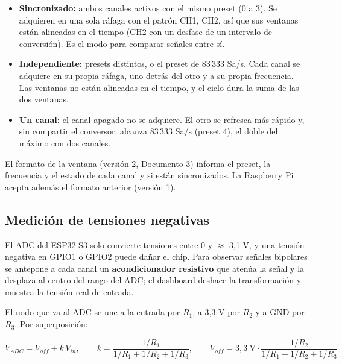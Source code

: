 \documentclass[12pt,a4paper]{article}
\begin{document}
\begin{itemize}
  \item \textbf{Sincronizado:} ambos canales activos con el mismo preset (0 a 3). Se adquieren en una sola ráfaga con el patrón CH1, CH2, así que sus ventanas están alineadas en el tiempo (CH2 con un desfase de un intervalo de conversión). Es el modo para comparar señales entre sí.
  \item \textbf{Independiente:} presets distintos, o el preset de 83\,333 Sa/s. Cada canal se adquiere en su propia ráfaga, uno detrás del otro y a su propia frecuencia. Las ventanas no están alineadas en el tiempo, y el ciclo dura la suma de las dos ventanas.
  \item \textbf{Un canal:} el canal apagado no se adquiere. El otro se refresca más rápido y, sin compartir el conversor, alcanza 83\,333 Sa/s (preset 4), el doble del máximo con dos canales.
\end{itemize}

El formato de la ventana (versión 2, Documento 3) informa el preset, la frecuencia y el estado de cada canal y si están sincronizados. La Raspberry Pi acepta además el formato anterior (versión 1).

\subsection{Medición de tensiones negativas}

El ADC del ESP32-S3 solo convierte tensiones entre 0 y $\approx$ 3{,}1 V, y una tensión negativa en GPIO1 o GPIO2 puede dañar el chip. Para observar señales bipolares se antepone a cada canal un \textbf{acondicionador resistivo} que atenúa la señal y la desplaza al centro del rango del ADC; el dashboard deshace la transformación y muestra la tensión real de entrada.

El nodo que va al ADC se une a la entrada por $R_1$, a 3{,}3 V por $R_2$ y a GND por $R_3$. Por superposición:

\begin{equation}
V_{ADC} = V_{off} + k\,V_{in}, \qquad
k = \frac{1/R_1}{1/R_1 + 1/R_2 + 1/R_3}, \qquad
V_{off} = 3{,}3\ \text{V}\cdot\frac{1/R_2}{1/R_1 + 1/R_2 + 1/R_3}
\end{equation}
\end{document}
